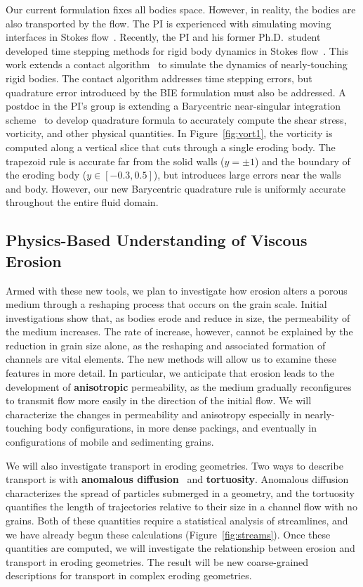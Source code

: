 \documentclass[11pt]{article}
\begin{document}
Our current formulation fixes all bodies space.  However, in reality,
the bodies are also transported by the flow.  The PI is experienced with
simulating moving interfaces in Stokes flow~\cite{qua-bir2014,
qua-bir2016}. Recently, the PI and his former Ph.D.~student developed
time stepping methods for rigid body dynamics in Stokes
flow~\cite{bys-sha-qua2018}.  This work extends a contact
algorithm~\cite{lu-rah-zor2017} to simulate the dynamics of
nearly-touching rigid bodies.  The contact algorithm addresses time
stepping errors, but quadrature error introduced by the BIE formulation
must also be addressed.  A postdoc in the PI's group is extending a
Barycentric near-singular integration scheme~\cite{bar-wu-vee2015} to
develop quadrature formula to accurately compute the shear stress,
vorticity, and other physical quantities.  In Figure~\ref{fig:vort1},
the vorticity is computed along a vertical slice that cuts through a
single eroding body.  The trapezoid rule is accurate far from the solid
walls ($y = \pm 1$) and the boundary of the eroding body ($y \in
[-0.3,0.5]$), but introduces large errors near the walls and body.
However, our new Barycentric quadrature rule is uniformly accurate
throughout the entire fluid domain.


\subsection{Physics-Based Understanding of Viscous Erosion}

Armed with these new tools, we plan to investigate how erosion alters a
porous medium through a reshaping process that occurs on the grain
scale. Initial investigations show that, as bodies erode and reduce in
size, the permeability of the medium increases. The rate of increase,
however, cannot be explained by the reduction in grain size alone, as
the reshaping and associated formation of channels are vital elements.
The new methods will allow us to examine these features in more detail.
In particular, we anticipate that erosion leads to the development of
{\bf anisotropic} permeability, as the medium gradually reconfigures to
transmit flow more easily in the direction of the initial flow. We will
characterize the changes in permeability and anisotropy especially in
nearly-touching body configurations, in more dense packings, and
eventually in configurations of mobile and sedimenting grains. 

We will also investigate transport in eroding geometries. Two ways to
describe transport is with {\bf anomalous
diffusion}~\cite{dea-qua-bir-jua2018} and {\bf tortuosity}.  Anomalous
diffusion characterizes the spread of particles submerged in a geometry,
and the tortuosity quantifies the length of trajectories relative to
their size in a channel flow with no grains.  Both of these quantities
require a statistical analysis of streamlines, and we have already begun
these calculations (Figure~\ref{fig:streams}).  Once these quantities
are computed, we will investigate the relationship between erosion and
transport in eroding geometries.  The result will be new coarse-grained
descriptions for transport in complex eroding geometries.
\end{document}
